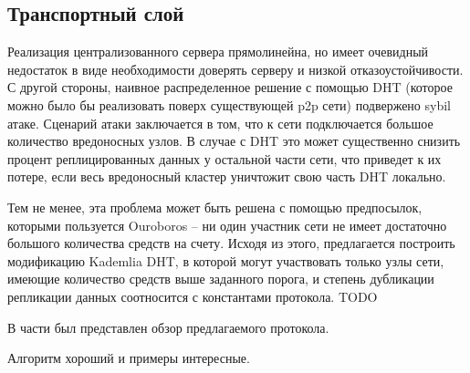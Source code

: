 \documentclass[]{itmo-student-thesis}
\begin{document}
\subsection{Транспортный слой}

Реализация централизованного сервера прямолинейна, но имеет очевидный
недостаток в виде необходимости доверять серверу и низкой
отказоустойчивости. С другой стороны, наивное распределенное решение с
помощью DHT (которое можно было бы реализовать поверх существующей p2p
сети) подвержено sybil атаке. Сценарий атаки заключается в том, что к
сети подключается большое количество вредоносных узлов. В случае с DHT
это может существенно снизить процент реплицированных данных у
остальной части сети, что приведет к их потере, если весь вредоносный
кластер уничтожит свою часть DHT локально.

Тем не менее, эта проблема может быть решена с помощью предпосылок,
которыми пользуется Ouroboros -- ни один участник сети не имеет
достаточно большого количества средств на счету. Исходя из этого,
предлагается построить модификацию Kademlia DHT, в которой могут
участвовать только узлы сети, имеющие количество средств выше
заданного порога, и степень дубликации репликации данных соотносится с
константами протокола. TODO

\chapterconclusion

В части был представлен обзор предлагаемого протокола.

\startconclusionpage

Алгоритм хороший и примеры интересные.

\printmainbibliography
\end{document}
